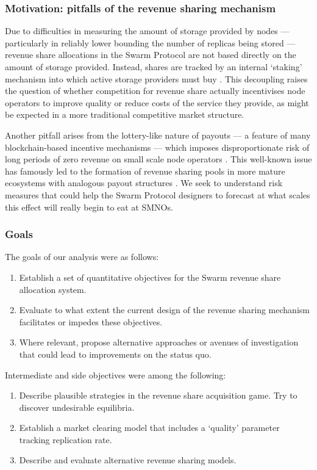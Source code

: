 \subsubsection{Motivation: pitfalls of the revenue sharing mechanism}
\label{section:pitfalls}
%
Due to difficulties in measuring the amount of storage provided by nodes --- particularly in reliably lower bounding the number of replicas being stored --- revenue share allocations in the Swarm Protocol are not based directly on the amount of storage provided.
%
Instead, shares are tracked by an internal `staking' mechanism into which active storage providers must buy \cite[\S3.4.3]{book-of-swarm}.
%
This decoupling raises the question of whether competition for revenue share actually incentivises node operators to improve quality or reduce costs of the service they provide, as might be expected in a more traditional competitive market structure.

Another pitfall arises from the lottery-like nature of payouts --- a feature of many blockchain-based incentive mechanisms --- which imposes disproportionate risk of long periods of zero revenue on small scale node operators \cite{albrecher2022blockchain}.
%
This well-known issue has famously led to the formation of revenue sharing pools in more mature ecosystems with analogous payout structures \cite{rosenfeld2011analysis}.
%
We seek to understand risk measures that could help the Swarm Protocol designers to forecast at what scales this effect will really begin to eat at SMNOs.

\subsubsection{Goals}

The goals of our analysis were as follows:
%
\begin{enumerate}
  \item 
    Establish a set of quantitative objectives for the Swarm revenue share allocation system.

  \item 
    Evaluate to what extent the current design of the revenue sharing mechanism facilitates or impedes these objectives.

  \item 
    Where relevant, propose alternative approaches or avenues of investigation that could lead to improvements on the status quo.
\end{enumerate}
%
Intermediate and side objectives were among the following:
%
\begin{enumerate}[resume]
  \item 
    Describe plausible strategies in the revenue share acquisition game. Try to discover undesirable equilibria.
  
  \item 
    Establish a market clearing model that includes a `quality' parameter tracking replication rate.
  
  \item 
    Describe and evaluate alternative revenue sharing models.

\end{enumerate}

